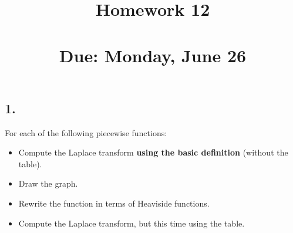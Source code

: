 
\usepackage{multicol}
\title{Homework 12 \\ \hfill \\ Due: Monday, June 26}


\maketitle

\thispagestyle{fancy}







\subsection*{1. }
For each of the following piecewise functions:
\begin{itemize}
	\item Compute the Laplace transform \textbf{using the basic definition} (without the table).
	\item Draw the graph.
	\item Rewrite the function in terms of Heaviside functions.
	\item Compute the Laplace transform, but this time using the table.
\end{itemize}
\vspace{1em}
